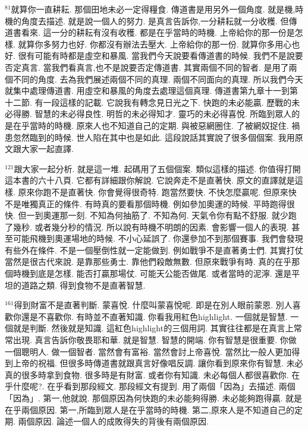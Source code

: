\documentclass{book}
\begin{document}
$^{81}$就算你一直耕耘.
那個田地未必一定得糧食.
傳道書是用另外一個角度.
就是機,時機的角度去描述.
就是說一個人的努力.
是真言告訴你,一分耕耘就一分收穫.
但傳道書看來.
這一分的耕耘有沒有收穫.
都是在乎當時的時機.
上帝給你的那一份是怎樣.
就算你多努力也好.
你都沒有辦法去壓大.
上帝給你的那一份.
就算你多用心也好.
很有可能有時都是虛空和暴風.
當我們今天說要看傳道書的時候.
我們不是說要否定真言.
當我們看真言,也不是說要否定傳道書.
其實兩個不同的智者.
是用了兩個不同的角度.
去為我們展述兩個不同的真理.
兩個不同面向的真理.
所以我們今天就集中處理傳道書.
用虛空和暴風的角度去處理這個真理.
傳道書第九章十一到第十二節.
有一段這樣的記載.
它說我有轉念見日光之下.
快跑的未必能贏.
歷戰的未必得勝.
智慧的未必得良性.
明哲的未必得知才.
靈巧的未必得喜悅.
所臨到眾人的是在乎當時的時機.
原來人也不知道自己的定期.
與被惡網圈住.
了被網奴捉住.
禍患忽然臨到的時候.
世人陷在其中也是如此.
這段說話其實說了很多個個案.
我用原文跟大家一起直譯.

$^{121}$跟大家一起分析.
就是這一堆.
起碼用了五個個案.
類似這樣的描述.
你值得打開這本書的六十八頁.
它都有詳細跟你解說.
它說奔走不是直著快.
原文的直譯就是這樣.
原來你跑不是直著快.
你會覺得很奇特.
跑當然要快.
不快怎麼贏呢.
但原來快不是唯獨真正的條件.
有時真的要看那個時機.
例如參加奧運的時候.
平時跑得很快.
但一到奧運那一刻.
不知為何抽筋了.
不知為何.
天氣令你有點不舒服.
就少跑了幾秒.
或者幾分秒的情況.
所以說有時機不明朗的因素.
會影響一個人的表現.
甚至可能飛機到奧運場地的時候.
不小心延誤了.
你還參加不到那個賽事.
我們會發現有些外在條件.
不是一個壓倒性就一定能做到.
例如戰爭不是直著勇士們.
其實打仗當然是很古代來說.
是靠那些勇士.
靠他們殺敵無數.
但原來戰爭有時.
真的在乎那個時機到底是怎樣.
能否打贏那場仗.
可能天公能否做尾.
或者當時的泥濘.
還是平坦的道路之類.
得到食物不是直著智慧.

$^{161}$得到財富不是直著判斷.
蒙喜悅.
什麼叫蒙喜悅呢.
即是在別人眼前蒙恩.
別人喜歡你還是不喜歡你.
有時並不直著知識.
你看我用紅色highlight.
一個就是智慧.
一個就是判斷.
然後就是知識.
這紅色highlight的三個用詞.
其實往往都是在真言上常常出現.
真言告訴你敬畏耶和華.
就是智慧.
智慧的開端.
你有智慧是很重要.
你做一個聰明人.
做一個智者.
當然會有富裕.
當然會討上帝喜悅.
當然比一般人更加得到上帝的祝福.
但很多時傳道書就跟真言好像唱反調.
讓你看到原來你有智慧.
未必真的很多時拿到食物.
很多時是有財富.
或者你有知識.
未必每個人都很喜歡你.
在乎什麼呢?.
在乎看到那段經文.
那段經文有提到.
用了兩個「因為」去描述.
兩個「因為」.
第一,他就說.
那個原因為何快跑的未必能夠得勝.
未必能夠跑得贏.
就是在乎兩個原因.
第一,所臨到眾人是在乎當時的時機.
第二,原來人是不知道自己的定期.
兩個原因.
論述一個人的成敗得失的背後有兩個原因.
\end{document}
